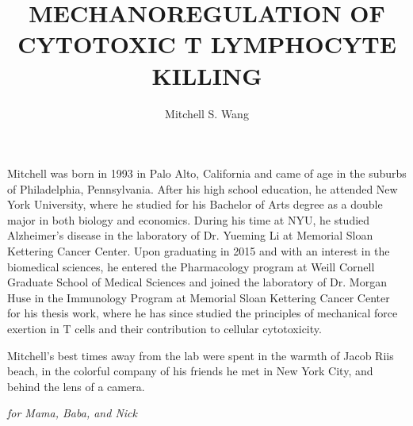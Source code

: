 \documentclass[phd,tocprelim]{cornell}
\title{MECHANOREGULATION OF CYTOTOXIC T LYMPHOCYTE KILLING}
\author {Mitchell S. Wang}
\begin{document}
\maketitle
\makecopyright

\begin{abstract}

\end{abstract}

\begin{biosketch}
Mitchell was born in 1993 in Palo Alto, California and came of age in the suburbs of Philadelphia, Pennsylvania. After his high school education, he attended New York University, where he studied for his Bachelor of Arts degree as a double major in both biology and economics. During his time at NYU, he studied Alzheimer’s disease in the laboratory of Dr. Yueming Li at Memorial Sloan Kettering Cancer Center. Upon graduating in 2015 and with an interest in the biomedical sciences, he entered the Pharmacology program at Weill Cornell Graduate School of Medical Sciences and joined the laboratory of Dr. Morgan Huse in the Immunology Program at Memorial Sloan Kettering Cancer Center for his thesis work, where he has since studied the principles of mechanical force exertion in T cells and their contribution to cellular cytotoxicity.

Mitchell's best times away from the lab were spent in the warmth of Jacob Riis beach, in the colorful company of his friends he met in New York City, and behind the lens of a camera.
\end{biosketch}

\begin{dedication}
\emph{for Mama, Baba, and Nick}
\end{dedication}
\end{document}
